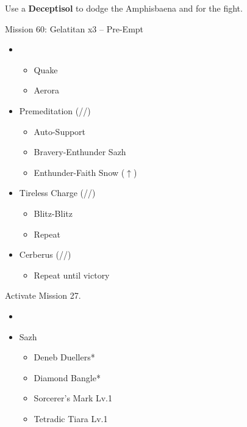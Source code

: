 \renewcommand{\first}{[1] Cerberus (\com/\com/\com)}
\renewcommand{\second}{[2] Thaumaturgy (\rav/\rav/\med)}
\renewcommand{\third}{[3] Tireless Charge (\com/\com/\med)}
\renewcommand{\fifth}{[5] Premeditation (\syn/\sen/\sab)}

Use a \textbf{Deceptisol} to dodge the Amphisbaena and for the fight.

\begin{battle}{Mission 60: Gelatitan x3 -- Pre-Empt}
	\begin{itemize}
		\item \sixth
			\begin{itemize}
				\item Quake
				\item Aerora
			\end{itemize}
		\item \fifth
			\begin{itemize}
				\item Auto-Support
				\item Bravery-Enthunder Sazh
				\item Enthunder-Faith Snow ($\uparrow$)
			\end{itemize}
		\item \third
			\begin{itemize}
				\item Blitz-Blitz
				\item Repeat
			\end{itemize}
		\item \first
			\begin{itemize}
				\item Repeat until victory
			\end{itemize}
	\end{itemize}
\end{battle}

Activate Mission 27.

\begin{menu}
	\begin{itemize}
	\paradigm
		\begin{itemize}
			\item {}%
				{\paradigmline{\com}{\com}{\com}}%
				{\paradigmline{\rav}{\rav}{\med}}%
				{\paradigmline{\com}{\com}{\med}}%
				{\paradigmline[4]{\com}{\sen}{\med}}%
				{\paradigmline{\syn}{\sen}{(\med)}}%
				{\paradigmline{\rav}{\rav}{(\rav)}}%
		\end{itemize}
	\equip
		\begin{itemize}
			\item Sazh
				\begin{itemize}
					\item Deneb Duellers*
					\item Diamond Bangle*
					\item Sorcerer's Mark Lv.1
					\item Tetradic Tiara Lv.1
				\end{itemize}
		\end{itemize}
	\end{itemize}
\end{menu}

